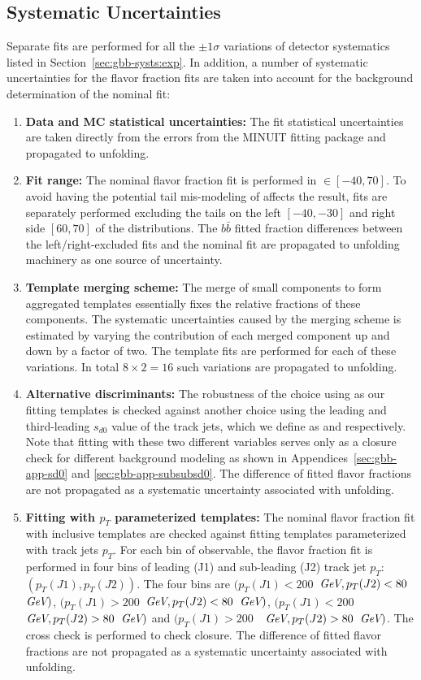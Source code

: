 \subsection{Systematic Uncertainties}
\label{sec:gbb-sub_systematics}

Separate fits are performed for all the $\pm 1\sigma$ variations of detector systematics listed in Section~\ref{sec:gbb-systs:exp}. In addition, a number of systematic uncertainties for the flavor fraction fits are taken into account for the background determination of the nominal fit:
\begin{enumerate}
  \item \textbf{Data and MC statistical uncertainties:} The fit statistical uncertainties are taken directly from the errors from the MINUIT fitting package and propagated to unfolding.
  \item \textbf{Fit range:} The nominal flavor fraction fit is performed in \subsdzero$\in[-40, 70]$. To avoid having the potential tail mis-modeling of \subsdzero affects the result, fits are separately performed excluding the tails on the left $[-40, -30]$ and right side $[60, 70]$ of the \subsdzero distributions. The $b\bar b$ fitted fraction differences between the left/right-excluded fits and the nominal fit are propagated to unfolding machinery as one source of uncertainty. 
  \item \textbf{Template merging scheme:} The merge of small components to form aggregated templates essentially fixes the relative fractions of these components. The systematic uncertainties caused by the merging scheme is estimated by varying the contribution of each merged component up and down by a factor of two. The template fits are performed for each of these variations. In total $8\times 2 =16$ such variations are propagated to unfolding.
  \item \textbf{Alternative discriminants:} The robustness of the choice using \subsdzero as our fitting templates is checked against another choice using the leading and third-leading $s_{d0}$ value of the track jets, which we define as \sdzero and \subsubsdzero respectively. Note that fitting with these two different variables serves only as a closure check for different background modeling as shown in Appendices~\ref{sec:gbb-app-sd0} and \ref{sec:gbb-app-subsubsd0}. The difference of fitted flavor fractions are not propagated as a systematic uncertainty associated with unfolding.
  \item \textbf{Fitting with $p_T$ parameterized templates:} The nominal flavor fraction fit with inclusive \subsdzero templates are checked against fitting templates parameterized with track jets $p_T$. For each bin of observable, the flavor fraction fit is performed in four bins of leading (J1) and sub-leading (J2) track jet $p_T$: $(p_T(J1), p_T(J2))$. The four bins are $(p_T(J1)<200$~$\textit{GeV}, p_T(J2)<80$~$\textit{GeV})$, $(p_T(J1)>200$~$\textit{GeV}, p_T(J2)<80$~$\textit{GeV})$, $(p_T(J1)<200$~$\textit{GeV}, p_T(J2)>80$~$\textit{GeV})$ and $(p_T(J1)>200$~~$\textit{GeV}, p_T(J2)>80$~$\textit{GeV})$. The cross check is performed to check closure. The difference of fitted flavor fractions are not propagated as a systematic uncertainty associated with unfolding.

\end{enumerate}
